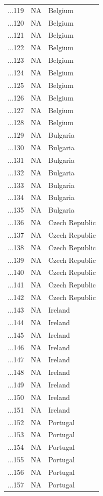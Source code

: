 \begin{longtable}{lrl}
...119 & NA & Belgium\\
...120 & NA & Belgium\\
\addlinespace
...121 & NA & Belgium\\
...122 & NA & Belgium\\
...123 & NA & Belgium\\
...124 & NA & Belgium\\
...125 & NA & Belgium\\
\addlinespace
...126 & NA & Belgium\\
...127 & NA & Belgium\\
...128 & NA & Belgium\\
...129 & NA & Bulgaria\\
...130 & NA & Bulgaria\\
\addlinespace
...131 & NA & Bulgaria\\
...132 & NA & Bulgaria\\
...133 & NA & Bulgaria\\
...134 & NA & Bulgaria\\
...135 & NA & Bulgaria\\
\addlinespace
...136 & NA & Czech Republic\\
...137 & NA & Czech Republic\\
...138 & NA & Czech Republic\\
...139 & NA & Czech Republic\\
...140 & NA & Czech Republic\\
\addlinespace
...141 & NA & Czech Republic\\
...142 & NA & Czech Republic\\
...143 & NA & Ireland\\
...144 & NA & Ireland\\
...145 & NA & Ireland\\
\addlinespace
...146 & NA & Ireland\\
...147 & NA & Ireland\\
...148 & NA & Ireland\\
...149 & NA & Ireland\\
...150 & NA & Ireland\\
\addlinespace
...151 & NA & Ireland\\
...152 & NA & Portugal\\
...153 & NA & Portugal\\
...154 & NA & Portugal\\
...155 & NA & Portugal\\
\addlinespace
...156 & NA & Portugal\\
...157 & NA & Portugal\\
\bottomrule
\end{longtable}
